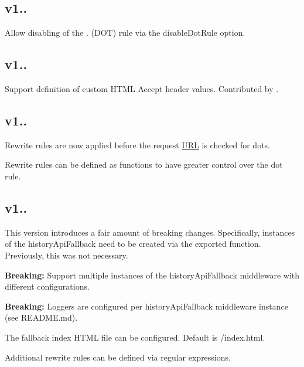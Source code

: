 \subsection*{v1..}


\begin{DoxyItemize}
\item Allow disabling of the {\ttfamily .} (D\+OT) rule via the {\ttfamily disable\+Dot\+Rule} option.
\end{DoxyItemize}

\subsection*{v1..}


\begin{DoxyItemize}
\item Support definition of custom H\+T\+ML {\ttfamily Accept} header values. Contributed by .
\end{DoxyItemize}

\subsection*{v1..}


\begin{DoxyItemize}
\item Rewrite rules are now applied before the request \mbox{\hyperlink{namespace_u_r_l}{U\+RL}} is checked for dots.
\item Rewrite rules can be defined as functions to have greater control over the {\ttfamily dot rule}.
\end{DoxyItemize}

\subsection*{v1..}

This version introduces a fair amount of breaking changes. Specifically, instances of the history\+Api\+Fallback need to be created via the exported function. Previously, this was not necessary.


\begin{DoxyItemize}
\item {\bfseries Breaking\+:} Support multiple instances of the history\+Api\+Fallback middleware with different configurations.
\item {\bfseries Breaking\+:} Loggers are configured per history\+Api\+Fallback middleware instance (see {\ttfamily R\+E\+A\+D\+M\+E.\+md}).
\item The fallback index H\+T\+ML file can be configured. Default is {\ttfamily /index.html}.
\item Additional rewrite rules can be defined via regular expressions. 
\end{DoxyItemize}